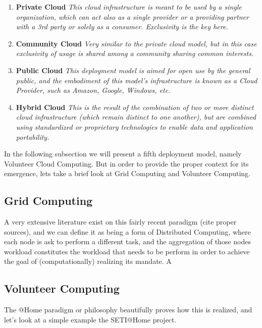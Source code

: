 \documentclass[11pt]{amsart}
\begin{document}
	\begin{enumerate}
		\item{\textbf{Private Cloud}} \emph{This cloud infrastructure is meant to be used by a single 
		organization, which can act also as a single provider or a providing partner with a 3rd party 
		or solely as a consumer. Exclusivity is the key here.}\\
		\item{\textbf{Community Cloud}} \emph{Very similar to the private cloud model, but in this 
		case exclusivity of usage is shared among a community sharing common interests.}\\
		\item{\textbf{Public Cloud}} \emph{This deployment model is aimed for open use by the general 
		public, and the embodiment of this model's infrastructure is known as a Cloud Provider, such 
		as Amazon, Google, Windows, etc.}\\
		\item{\textbf{Hybrid Cloud}} \emph{This is the result of the combination of two or more 
		distinct cloud infrastructure (which remain distinct to one another), but are combined using 
		standardized or proprietary technologies to enable data and application portability.}
	\end{enumerate}
	
	In the following subsection we will present a fifth deployment model, namely Volunteer Cloud 
	Computing. But in order to provide the proper context for its emergence, lets take a brief look
	at Grid Computing and Volunteer Computing.
	
	\subsection{Grid Computing}
	A very extensive literature exist on this fairly recent paradigm (cite proper sources), and we 
	can define it as being a form of Distributed Computing, where each node is ask to perform a 
	different task, and the aggregation of those nodes workload constitutes the workload that needs 
	to be perform in order to achieve the goal of (computationally) realizing its mandate. A
	
	\subsection{Volunteer Computing}
	The @Home paradigm or philosophy beautifully proves how this is realized, and let's look at a 
	simple example the SETI@Home project.
	
\end{document}
